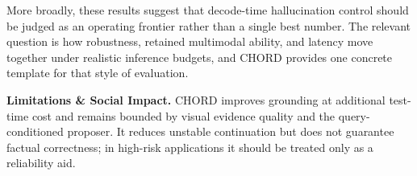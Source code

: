 \documentclass[sigconf,anonymous]{acmart}
\begin{document}
More broadly, these results suggest that decode-time hallucination control should be judged as an operating frontier rather than a single best number. The relevant question is how robustness, retained multimodal ability, and latency move together under realistic inference budgets, and CHORD provides one concrete template for that style of evaluation.

\noindent\textbf{Limitations \& Social Impact.}
CHORD improves grounding at additional test-time cost and remains bounded by visual evidence quality and the query-conditioned proposer. It reduces unstable continuation but does not guarantee factual correctness; in high-risk applications it should be treated only as a reliability aid.

\makeatletter
\@ACM@printacmreftrue
\makeatother
\clearpage


\end{document}
